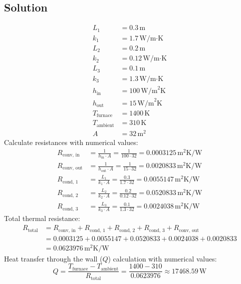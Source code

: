 \documentclass[12pt]{article}
\begin{document}
\subsection*{Solution}
\begin{align*}
L_1 &= 0.3 \, \text{m} \\
k_1 &= 1.7 \, \text{W/m·K} \\
L_2 &= 0.2 \, \text{m} \\
k_2 &= 0.12 \, \text{W/m·K} \\
L_3 &= 0.1 \, \text{m} \\
k_3 &= 1.3 \, \text{W/m·K} \\
h_{\text{in}} &= 100 \, \text{W/m}^2\text{K} \\
h_{\text{out}} &= 15 \, \text{W/m}^2\text{K} \\
T_{\text{furnace}} &= 1400 \, \text{K} \\
T_{\text{ambient}} &= 310 \, \text{K} \\
A &= 32 \, \text{m}^2
\end{align*}
\noindent
Calculate resistances with numerical values:
\begin{align*}
R_{\text{conv, in}} &= \frac{1}{h_{\text{in}} \cdot A} = \frac{1}{100 \cdot 32} = 0.0003125 \, \text{m}^2\text{K/W} \\
R_{\text{conv, out}} &= \frac{1}{h_{\text{out}} \cdot A} = \frac{1}{15 \cdot 32} = 0.0020833 \, \text{m}^2\text{K/W} \\
R_{\text{cond, 1}} &= \frac{L_1}{k_1 \cdot A} = \frac{0.3}{1.7 \cdot 32} = 0.0055147 \, \text{m}^2\text{K/W} \\
R_{\text{cond, 2}} &= \frac{L_2}{k_2 \cdot A} = \frac{0.2}{0.12 \cdot 32} = 0.0520833 \, \text{m}^2\text{K/W} \\
R_{\text{cond, 3}} &= \frac{L_3}{k_3 \cdot A} = \frac{0.1}{1.3 \cdot 32} = 0.0024038 \, \text{m}^2\text{K/W}
\end{align*}
\noindent
Total thermal resistance:
\begin{align*}
R_{\text{total}} &= R_{\text{conv, in}} + R_{\text{cond, 1}} + R_{\text{cond, 2}} + R_{\text{cond, 3}} + R_{\text{conv, out}} \\
&= 0.0003125 + 0.0055147 + 0.0520833 + 0.0024038 + 0.0020833 \\
&= 0.0623976 \, \text{m}^2\text{K/W}
\end{align*}
\noindent
Heat transfer through the wall (\(Q\)) calculation with numerical values:
\[ Q = \frac{T_{\text{furnace}} - T_{\text{ambient}}}{R_{\text{total}}} = \frac{1400 - 310}{0.0623976} \approx 17468.59 \, \text{W} \]
\end{document}
